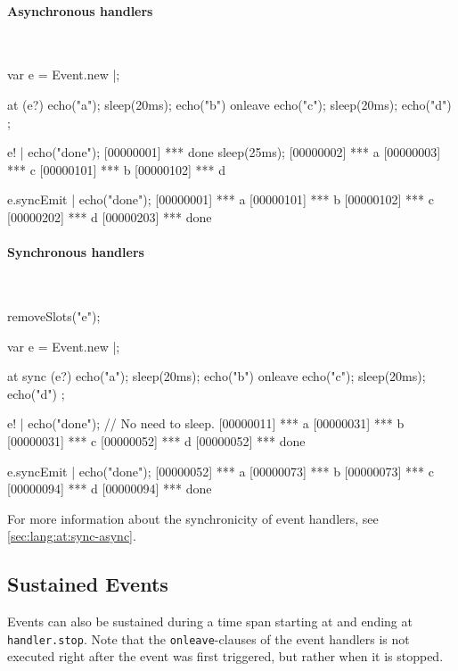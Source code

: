 \begin{multicols}{2}
\paragraph{Asynchronous handlers}~

\begin{urbiscript}[xrightmargin=0mm,xleftmargin=0mm]
var e = Event.new |;

at (e?)
  { echo("a"); sleep(20ms); echo("b") }
onleave
  { echo("c"); sleep(20ms); echo("d") };

e! | echo("done");
[00000001] *** done
sleep(25ms);
[00000002] *** a
[00000003] *** c
[00000101] *** b
[00000102] *** d

e.syncEmit | echo("done");
[00000001] *** a
[00000101] *** b
[00000102] *** c
[00000202] *** d
[00000203] *** done
\end{urbiscript}
\columnbreak

\paragraph{Synchronous handlers}~

\begin{urbicomment}
removeSlots("e");
\end{urbicomment}
\begin{urbiscript}[xrightmargin=0mm,xleftmargin=0mm]
var e = Event.new |;

at sync (e?)
  { echo("a"); sleep(20ms); echo("b") }
onleave
  { echo("c"); sleep(20ms); echo("d") };

e! | echo("done");
// No need to sleep.
[00000011] *** a
[00000031] *** b
[00000031] *** c
[00000052] *** d
[00000052] *** done

e.syncEmit | echo("done");
[00000052] *** a
[00000073] *** b
[00000073] *** c
[00000094] *** d
[00000094] *** done
\end{urbiscript}
\end{multicols}

For more information about the synchronicity of event handlers, see
\autoref{sec:lang:at:sync-async}.

\subsection{Sustained Events}
\label{sec:event:sustain}

Events can also be sustained during a time span starting at
 and ending at \lstinline|handler.stop|.  Note that the
\lstinline|onleave|-clauses of the event handlers is not executed right
after the event was first triggered, but rather when it is stopped.

